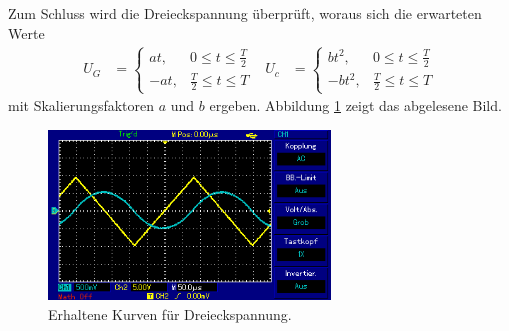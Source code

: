Zum Schluss wird die Dreieckspannung überprüft, woraus sich die erwarteten Werte
\begin{align}
  U_G &=
  \begin{cases}
    at , &  0 \leq t \leq \frac{T}{2} \\
    -at , & \frac{T}{2} \leq t \leq T
  \end{cases}
  & U_c &=
  \begin{cases}
    b t^2 , &  0 \leq t \leq \frac{T}{2} \\
    -b t^2 , & \frac{T}{2} \leq t \leq T
  \end{cases}
\end{align}
mit Skalierungsfaktoren $a$ und $b$ ergeben.
Abbildung \ref{fig:s_s} zeigt das abgelesene Bild.

\begin{figure}[H]
  \centering
  \includegraphics[height=4.5cm]{oz6.png}
  \caption{Erhaltene Kurven für Dreieckspannung.}
  \label{fig:s_s}
\end{figure}
